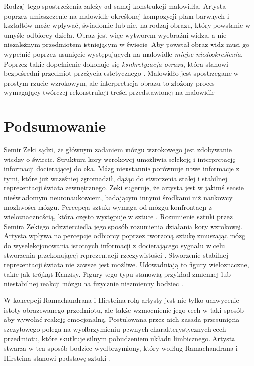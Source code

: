 \documentclass[licencjacka]{kdypl}
\begin{document}
Rodzaj tego spostrzeżenia zależy od samej konstrukcji malowidła. Artysta poprzez umieszczenie na malowidle określonej kompozycji plam barwnych i kształtów może wpływać, świadomie lub nie, na rodzaj obrazu, który powstanie w umyśle odbiorcy dzieła. Obraz jest więc wytworem wyobraźni widza, a nie niezależnym przedmiotem istniejącym w świecie. Aby powstał obraz widz musi go wypełnić poprzez usunięcie występujących na malowidle \textit{miejsc niedookreślenia}. Poprzez takie dopełnienie dokonuje się \textit{konkretyzacja obrazu}, która stanowi bezpośredni przedmiot przeżycia estetycznego \citep[s. 99]{Ingarden1958}. Malowidło jest spostrzegane w prostym rzucie wzrokowym, ale interpretacja obrazu to złożony proces wymagający twórczej rekonstrukcji treści przedstawionej na malowidle \citep[s. 69]{Ingarden1958}






\section{Podsumowanie}

Semir Zeki sądzi, że głównym zadaniem mózgu wzrokowego jest zdobywanie wiedzy o świecie. Struktura kory wzrokowej umożliwia selekcję i interpretację informacji docierającej do oka. Mózg nieustannie porównuje nowe informacje z tymi, które już wcześniej zgromadził, dążąc do stworzenia stałej i stabilnej reprezentacji świata zewnętrznego. Zeki sugeruje, że artysta jest w jakimś sensie nieświadomym neuronaukowcem, badającym innymi środkami niż naukowcy możliwości mózgu. Percepcja sztuki wymaga od mózgu konfrontacji z wieloznacznością, która często występuje w sztuce \citep{Wieloznacznosc}.   Rozumienie sztuki przez Semira Zekiego odzwierciedla jego sposób rozumienia działania kory wzrokowej. Artysta wpływa na percepcje odbiorcy poprzez tworzoną sztukę zmuszając mózg do wyselekcjonowania istotnych informacji z docierającego sygnału w celu stworzenia przekonującej reprezentacji rzeczywistości \citep[s. 14-15]{Bremer}. Stworzenie stabilnej reprezentacji świata nie zawsze jest możliwe. Udowadniają to figury wieloznaczne, takie jak trójkąt Kanzisy. Figury tego typu stanowią przykład zmiennej lub niestabilnej reakcji mózgu na fizycznie niezmienny bodziec \citep[s. 73-74]{Zeki}.

W koncepcji Ramachandrana i Hirsteina rolą artysty jest nie tylko uchwycenie istoty obrazowanego przedmiotu, ale także wzmocnienie jego cech w taki sposób aby wywołać reakcję emocjonalną. Postulowana przez nich zasada przesunięcia szczytowego polega na wyolbrzymieniu pewnych charakterystycznych cech przedmiotu, które skutkuje silnym pobudzeniem układu limbicznego. Artysta stwarza w ten sposób bodziec wyolbrzymiony, który według  Ramachandrana i Hirsteina stanowi podstawę sztuki \citep[s. 332-336]{Rama}.
\end{document}
